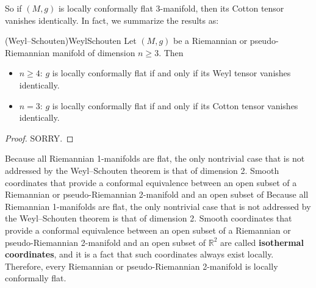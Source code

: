 \documentclass[../main.tex]{subfiles}
\begin{document}
So if $(M, g)$ is locally conformally flat 3-manifold, then its Cotton tensor vanishes identically. In fact, we summarize the results as:

\begin{theorem}{(Weyl–Schouten)}{WeylSchouten}
	Let $(M, g)$ be a Riemannian or pseudo-Riemannian manifold of dimension $n \geq 3$. Then
	\begin{itemize}
		\item $n \geq 4$: $g$ is locally conformally flat if and only if its Weyl tensor vanishes identically.
		\item $n = 3$: $g$ is locally conformally flat if and only if its Cotton tensor vanishes identically.
	\end{itemize}
\end{theorem}
\begin{proof}
	SORRY.
\end{proof}

\begin{remark}
	Because all Riemannian 1-manifolds are flat, the only nontrivial case that is not addressed by the Weyl–Schouten theorem is that of dimension 2. Smooth coordinates that provide a conformal equivalence between an open subset of a Riemannian or pseudo-Riemannian 2-manifold and an open subset of Because all Riemannian 1-manifolds are flat, the only nontrivial case that is not addressed by the Weyl–Schouten theorem is that of dimension 2. Smooth coordinates that provide a conformal equivalence between an open subset of a Riemannian or pseudo-Riemannian 2-manifold and an open subset of $\mathbb{R}^2$ are called \textbf{isothermal coordinates}, and it is a fact that such coordinates always exist locally. Therefore, every Riemannian or pseudo-Riemannian 2-manifold is locally conformally flat.
\end{remark}
\end{document}
